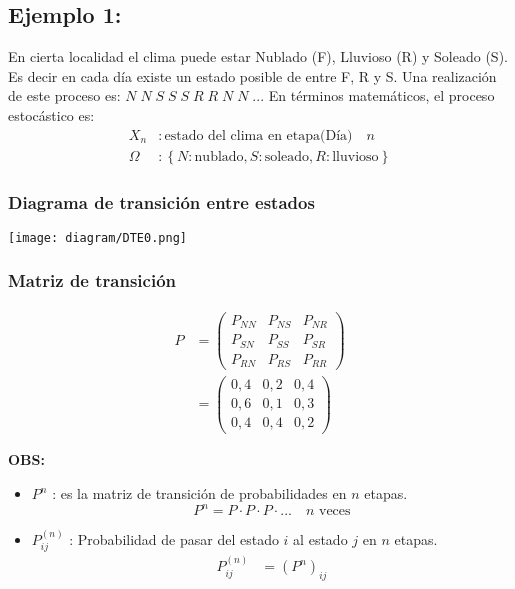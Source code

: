 \documentclass{templateNote}
\begin{document}
\newpage
\subsection{Ejemplo 1:}
En cierta localidad el clima puede estar Nublado (F), Lluvioso (R) y Soleado (S). \newline
Es decir en cada día existe un estado posible de entre F, R y S. \newline
Una realizaci\'on de este proceso es: $N\; N\; S\; S\; S\; R\; R\; N\; N\; ...$ \newline
En términos matemáticos, el proceso estocástico es:
\begin{align*}
    X_n &: \text{estado del clima en etapa(D\'ia)} \quad n \\
    \Omega &: \left\{N:\text{nublado}, S:\text{soleado}, R:\text{lluvioso}\right\}    
\end{align*}
\subsubsection*{Diagrama de transici\'on entre estados}
\begin{center}
    \texttt{[image: diagram/DTE0.png]}
\end{center}
\subsubsection*{Matriz de transici\'on}
\begin{align*}
    P &= \left(\begin{matrix}
        P_{NN} & P_{NS} & P_{NR} \\
        P_{SN} & P_{SS} & P_{SR} \\
        P_{RN} & P_{RS} & P_{RR}
    \end{matrix} \right) \\
    &= \left(\begin{matrix}
        0,4 & 0,2 & 0,4 \\
        0,6 & 0,1 & 0,3 \\
        0,4 & 0,4 & 0,2
    \end{matrix} \right)
\end{align*}

\textbf{OBS:} 
\begin{itemize}
    \item $P^n$ : es la matriz de transici\'on de probabilidades en $n$ etapas. 
    \begin{equation*}
        P^n = P \cdot P \cdot P \cdot ... \quad n \text{ veces}
    \end{equation*}

    \item $P_{ij}^{(n)}$ : Probabilidad de pasar del estado $i$ al estado $j$ en $n$ etapas.
    \begin{align*}
        P_{ij}^{(n)} &= (P^n)_{ij}
    \end{align*}
\end{itemize}
\newpage
\end{document}
